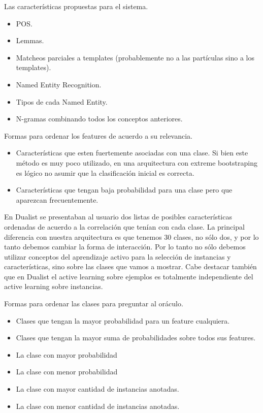 Las características propuestas para el sistema.
\begin{itemize}
    \item POS.
    \item Lemmas.
    \item Matcheos parciales a templates (probablemente no a las partículas sino a los templates).
    \item Named Entity Recognition.
    \item Tipos de cada Named Entity.
    \item N-gramas combinando todos los conceptos anteriores.

\end{itemize}


Formas para ordenar los features de acuerdo a su relevancia.
\begin{itemize}
	\item Características que esten fuertemente asociadas con una clase. Si bien este método es muy poco utilizado, en una arquitectura con extreme bootstraping es lógico no asumir que la clasificación inicial es correcta.
	\item Características que tengan baja probabilidad para una clase pero que
	aparezcan frecuentemente.
\end{itemize}

En Dualist se presentaban al usuario dos listas de posibles características ordenadas de acuerdo a la correlación que tenían con cada clase. La principal diferencia con nuestra arquitectura es que tenemos 30 clases, no sólo dos, y por lo tanto debemos cambiar la forma de interacción. Por lo tanto no sólo debemos utilizar conceptos del aprendizaje activo para la selección de instancias y características, sino sobre las clases que vamos a mostrar. Cabe destacar también que en Dualist el active learning sobre ejemplos es totalmente independiente
del active learning sobre instancias.

Formas para ordenar las clases para preguntar al oráculo.
\begin{itemize}
	\item Clases que tengan la mayor probabilidad para un feature cualquiera.
	\item Clases que tengan la mayor suma de probabilidades sobre todos sus features.
	\item La clase con mayor probabilidad
	\item La clase con menor probabilidad
	\item La clase con mayor cantidad de instancias anotadas.
	\item La clase con menor cantidad de instancias anotadas.
\end{itemize}

